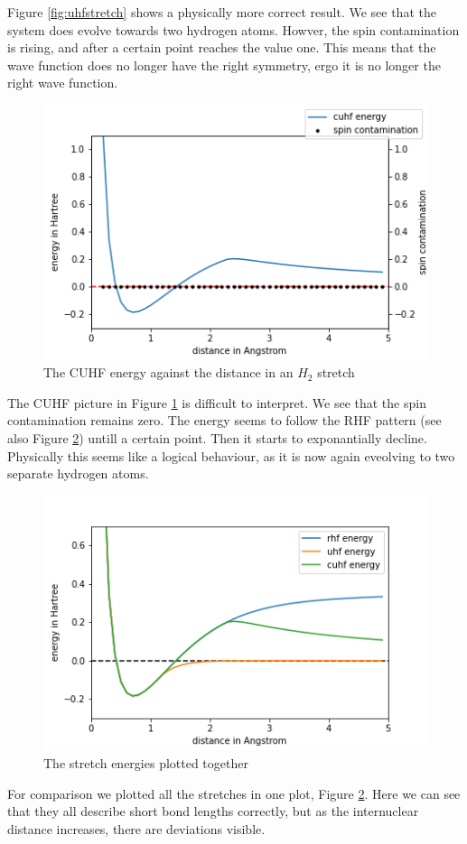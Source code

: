 \documentclass[twoside,twocolumn,9pt]{article}
\begin{document}
Figure \ref{fig:uhfstretch} shows a physically more correct result. We see that the system does evolve towards two hydrogen atoms. Howver, the spin contamination is rising, and after a certain point reaches the value one. This means that the wave function does no longer have the right symmetry, ergo it is no longer the right wave function.
\begin{center}
\begin{figure}[h]
  \includegraphics[width=\linewidth]{./../notes/figures/cuhf_mix.png}
  \caption{The CUHF energy against the distance in an $H_2$ stretch}
  \label{fig:cuhfstretch}
\end{figure}
\end{center}
The CUHF picture in Figure \ref{fig:cuhfstretch} is difficult to interpret. We see that the spin contamination remains zero. The energy seems to follow the RHF pattern (see also Figure \ref{fig:combo}) untill a certain point. Then it starts to exponantially decline. Physically this seems like a logical behaviour, as it is now again eveolving to two separate hydrogen atoms. 
\begin{center}
\begin{figure}[h]
  \includegraphics[width=\linewidth]{./../notes/figures/combo.png}
  \caption{The stretch energies plotted together}
  \label{fig:combo}
\end{figure}
\end{center}
For comparison we plotted all the stretches in one plot, Figure \ref{fig:combo}. Here we can see that they all describe short bond lengths correctly, but as the internuclear distance increases, there are deviations visible.
\end{document}
